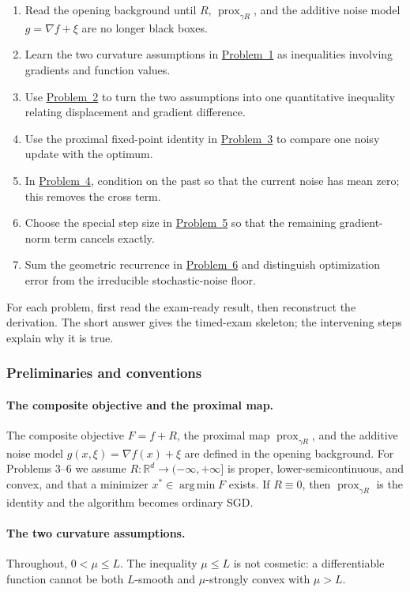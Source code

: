 \documentclass[11pt,a4paper]{article}
\DeclareMathOperator*{\argmin}{arg\,min}
\DeclareMathOperator{\prox}{prox}
\newcommand{\jump}[2]{\hyperref[#1]{#2}}
\theoremstyle{definition}
\begin{document}
\begin{enumerate}
  \item Read the opening background until $R$, $\prox_{\gamma R}$, and the additive noise model $g=\nabla f+\xi$ are no longer black boxes.
  \item Learn the two curvature assumptions in \jump{prob:spr2025-opt-1}{Problem~1} as inequalities involving gradients and function values.
  \item Use \jump{prob:spr2025-opt-2}{Problem~2} to turn the two assumptions into one quantitative inequality relating displacement and gradient difference.
  \item Use the proximal fixed-point identity in \jump{prob:spr2025-opt-3}{Problem~3} to compare one noisy update with the optimum.
  \item In \jump{prob:spr2025-opt-4}{Problem~4}, condition on the past so that the current noise has mean zero; this removes the cross term.
  \item Choose the special step size in \jump{prob:spr2025-opt-5}{Problem~5} so that the remaining gradient-norm term cancels exactly.
  \item Sum the geometric recurrence in \jump{prob:spr2025-opt-6}{Problem~6} and distinguish optimization error from the irreducible stochastic-noise floor.
\end{enumerate}

For each problem, first read the exam-ready result, then reconstruct the derivation. The short answer gives the timed-exam skeleton; the intervening steps explain why it is true.

\subsubsection{Preliminaries and conventions}

\paragraph{The composite objective and the proximal map.}
The composite objective $F=f+R$, the proximal map $\prox_{\gamma R}$, and the additive noise model $g(x,\xi)=\nabla f(x)+\xi$ are defined in the opening background. For Problems 3--6 we assume $R:\mathbb{R}^d\to(-\infty,+\infty]$ is proper, lower-semicontinuous, and convex, and that a minimizer $x^*\in\argmin F$ exists. If $R\equiv0$, then $\prox_{\gamma R}$ is the identity and the algorithm becomes ordinary SGD.

\paragraph{The two curvature assumptions.}
Throughout, $0<\mu\leq L$. The inequality $\mu\leq L$ is not cosmetic: a differentiable function cannot be both $L$-smooth and $\mu$-strongly convex with $\mu>L$.
\end{document}
